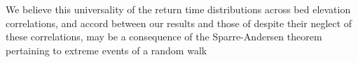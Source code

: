 \documentclass[draft]{agujournal2018}
\begin{document}
We believe this universality of the return time distributions across bed elevation correlations, and accord between our results and those of \citet{Martin2014} despite their neglect of these correlations, may be a consequence of the Sparre-Andersen theorem pertaining to extreme events of a random walk 





































\end{document}
